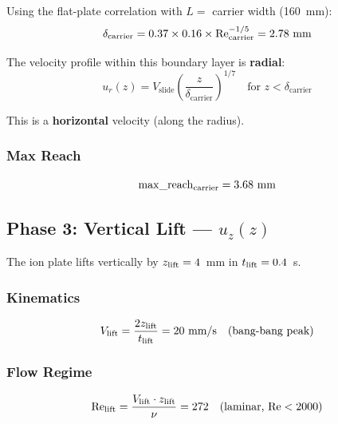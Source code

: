 \documentclass[11pt,a4paper]{article}
\begin{document}
Using the flat-plate correlation with $L = $ carrier width (160~mm):
\begin{equation}
  \delta_\mathrm{carrier} = 0.37 \times 0.16 \times \mathrm{Re}_\mathrm{carrier}^{-1/5}
    = 2.78~\text{mm}
\end{equation}

The velocity profile within this boundary layer is \textbf{radial}:
\begin{equation}
  \boxed{u_r(z) = V_\mathrm{slide} \left(\frac{z}{\delta_\mathrm{carrier}}\right)^{1/7}
    \quad \text{for } z < \delta_\mathrm{carrier}}
  \label{eq:u-r}
\end{equation}

This is a \textbf{horizontal} velocity (along the radius).

\subsubsection{Max Reach}

\begin{equation}
  \mathrm{max\_reach}_\mathrm{carrier} = 3.68~\text{mm}
\end{equation}

\subsection{Phase 3: Vertical Lift --- $u_z(z)$}

The ion plate lifts vertically by $z_\mathrm{lift} = 4$~mm in
$t_\mathrm{lift} = 0.4$~s.

\subsubsection{Kinematics}

\begin{equation}
  V_\mathrm{lift} = \frac{2 z_\mathrm{lift}}{t_\mathrm{lift}} = 20~\text{mm/s}
    \quad \text{(bang-bang peak)}
\end{equation}

\subsubsection{Flow Regime}

\begin{equation}
  \mathrm{Re}_\mathrm{lift} = \frac{V_\mathrm{lift} \cdot z_\mathrm{lift}}{\nu}
    = 272 \quad \text{(laminar, Re} < 2000\text{)}
\end{equation}
\end{document}
